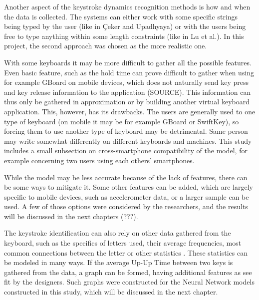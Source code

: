 Another aspect of the keystroke dynamics recognition methods is how and when the data is collected. The systems can either work with some specific strings being typed by the user (like in Çeker and Upadhyaya) or with the users being free to type anything within some length constraints (like in Lu et al.). In this project, the second approach was chosen as the more realistic one.

With some keyboards it may be more difficult to gather all the possible features. Even basic feature, such as the hold time can prove difficult to gather when using for example GBoard on mobile devices, which does not naturally send key press and key release information to the application (SOURCE). This information can thus only be gathered in approximation or by building another virtual keyboard application. This, however, has its drawbacks. The users are generally used to one type of keyboard (on mobile it may be for example GBoard or SwiftKey), so forcing them to use another type of keyboard may be detrimental. Same person may write somewhat differently on different keyboards and machines. This study includes a small subsection on cross-smartphone compatibility of the model, for example concerning two users using each others' smartphones.

While the model may be less accurate because of the lack of features, there can be some ways to mitigate it. Some other features can be added, which are largely specific to mobile devices, such as accelerometer data, or a larger sample can be used. A few of those options were considered by the researchers, and the results will be discussed in the next chapters (???).

The keystroke identification can also rely on other data gathered from the keyboard, such as the specifics of letters used, their average frequencies, most common connections between the letter or other statistics \cite{Wang2024}. These statistics can be modeled in many ways. If the average Up-Up Time between two keys is gathered from the data, a graph can be formed, having additional features as see fit by the designers. Such graphs were constructed for the Neural Network models constructed in this study, which will be discussed in the next chapter.